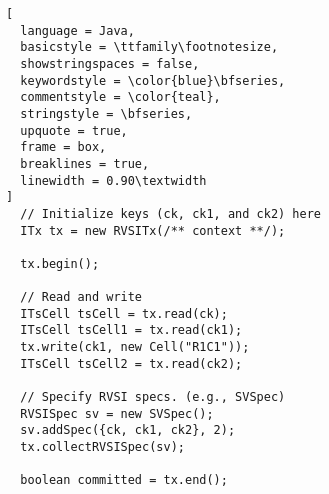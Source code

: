 \begin{lstlisting}[
  language = Java,
  basicstyle = \ttfamily\footnotesize,
  showstringspaces = false,
  keywordstyle = \color{blue}\bfseries,
  commentstyle = \color{teal},
  stringstyle = \bfseries,
  upquote = true,
  frame = box,
  breaklines = true,
  linewidth = 0.90\textwidth
]
  // Initialize keys (ck, ck1, and ck2) here
  ITx tx = new RVSITx(/** context **/);

  tx.begin();

  // Read and write
  ITsCell tsCell = tx.read(ck);
  ITsCell tsCell1 = tx.read(ck1);
  tx.write(ck1, new Cell("R1C1"));
  ITsCell tsCell2 = tx.read(ck2);

  // Specify RVSI specs. (e.g., SVSpec)
  RVSISpec sv = new SVSpec();
  sv.addSpec({ck, ck1, ck2}, 2);
  tx.collectRVSISpec(sv);

  boolean committed = tx.end();
\end{lstlisting}
